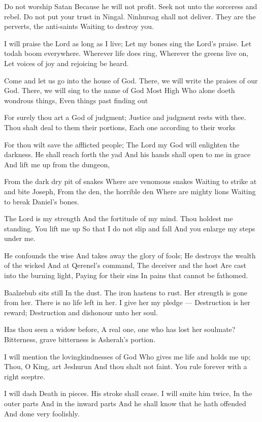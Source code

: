 \documentclass[
]{book}
\begin{document}
Do not worship Satan
Because he will not profit.
Seek not unto the sorceress and rebel.
Do not put your trust in Ningal.
Ninhursag shall not deliver.
They are the perverts, the anti-saints
Waiting to destroy you.

I will praise the Lord as long as I live;
Let my bones sing the Lord's praise.
Let todah boom everywhere.
Wherever life does ring,
Wherever the greens live on,
Let voices of joy and rejoicing be heard.

Come and let us go into the house of God.
There, we will write the praises of our God.
There, we will sing to the name of God Most High
Who alone doeth wondrous things,
Even things past finding out

For surely thou art a God of judgment;
Justice and judgment rests with thee.
Thou shalt deal to them their portions,
Each one according to their works

For thou wilt save the afflicted people;
The Lord my God will enlighten the darkness.
He shall reach forth the yad
And his hands shall open to me in grace
And lift me up from the dungeon,

From the dark dry pit of snakes
Where are venomous snakes
Waiting to strike at and bite Joseph,
From the den, the horrible den
Where are mighty lions
Waiting to break Daniel's bones.

The Lord is my strength
And the fortitude of my mind.
Thou holdest me standing.
You lift me up
So that I do not slip and fall
And you enlarge my steps under me.

He confounds the wise
And takes away the glory of fools;
He destroys the wealth of the wicked
And at Qerenel's command,
The deceiver and the host
Are cast into the burning light,
Paying for their sins
In pains that cannot be fathomed.

Baalzebub sits still
In the dust.
The iron hastens to rust.
Her strength is gone from her.
There is no life left in her.
I give her my pledge ---
Destruction is her reward;
Destruction and dishonour unto her soul.

Has thou seen a widow before,
A real one, one who has lost her soulmate?
Bitterness, grave bitterness is Asherah's portion.

I will mention the lovingkindnesses of God
Who gives me life and holds me up;
Thou, O King, art Jeshurun
And thou shalt not faint.
You rule forever with a right sceptre.

I will dash Death in pieces.
His stroke shall cease.
I will smite him twice,
In the outer parts
And in the inward parts
And he shall know that he hath offended
And done very foolishly.
\end{document}
